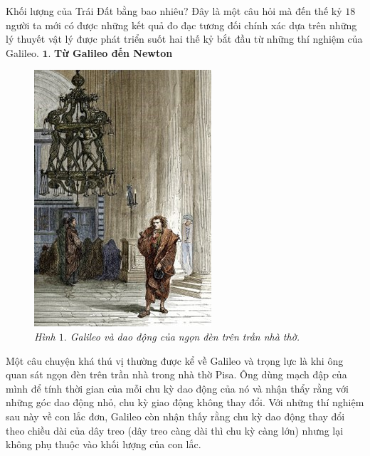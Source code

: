 \begin{multicols}{2}
	Khối lượng của Trái Đất bằng bao nhiêu? Đây là một câu hỏi mà đến thế kỷ $18$ người ta mới có được những kết quả đo đạc tương đối chính xác dựa trên những lý thuyết vật lý được phát triển suốt hai thế kỷ bắt đầu từ những thí nghiệm của Galileo.
	\vskip 0.1cm
	$\pmb{1.}$ \textbf{\color{timhieukhoahoc}Từ Galileo đến Newton}
	\begin{figure}[H]
		\vspace*{-5pt}
		\centering
		\captionsetup{labelformat= empty, justification=centering}
		\includegraphics[width= 0.75\linewidth]{1}
		\caption{\small\textit{\color{timhieukhoahoc}Hình ${1.}$ Galileo và dao động của ngọn đèn trên trần nhà thờ.}}
		\vspace*{-10pt}
	\end{figure}
	Một câu chuyện khá thú vị thường được kể về Galileo và trọng lực là khi ông quan sát ngọn đèn trên trần nhà trong nhà thờ Pisa. Ông dùng mạch đập của mình để tính thời gian của mỗi chu kỳ dao động của nó và nhận thẩy rằng với những góc dao động nhỏ, chu kỳ giao động không thay đổi. Với những thí nghiệm sau này về con lắc đơn, Galileo còn nhận thấy rằng chu kỳ dao động thay đổi theo chiều dài của dây treo (dây treo càng dài thì chu kỳ càng lớn) nhưng lại không phụ thuộc vào khối lượng của con lắc.

\end{multicols}
